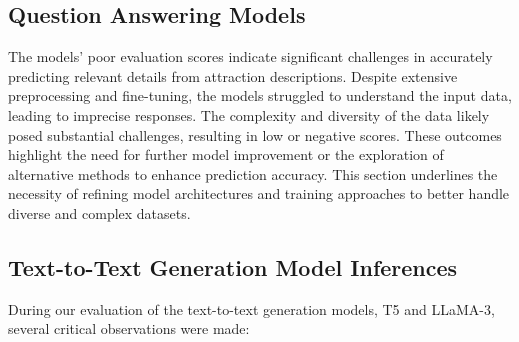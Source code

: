\documentclass[conference]{IEEEtran}
\begin{document}
    \subsection{Question Answering Models}

        The models' poor evaluation scores indicate significant challenges in accurately predicting relevant details from attraction descriptions. Despite extensive preprocessing and fine-tuning, the models struggled to understand the input data, leading to imprecise responses. The complexity and diversity of the data likely posed substantial challenges, resulting in low or negative scores. These outcomes highlight the need for further model improvement or the exploration of alternative methods to enhance prediction accuracy. This section underlines the necessity of refining model architectures and training approaches to better handle diverse and complex datasets.

    \subsection{Text-to-Text Generation Model Inferences}

        During our evaluation of the text-to-text generation models, T5 and LLaMA-3, several critical observations were made:
\end{document}
